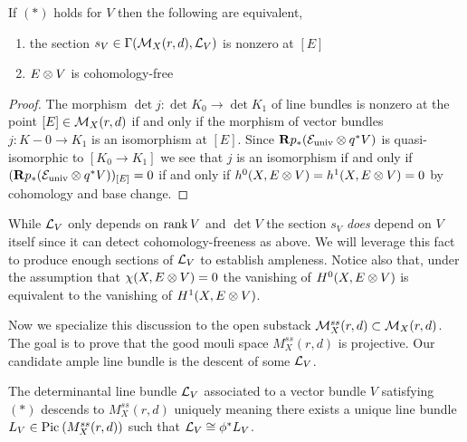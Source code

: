 \documentclass[12pt]{article}
\begin{document}
\begin{prop}
If $(\ast)$ holds for $V$ then the following are equivalent,
\begin{enumerate}
\item the section $s_V \in \Gamma(\mathcal{M}_X(r,d), \mathcal{L}_V)$ is nonzero at $[E]$
\item $E \otimes V$ is cohomology-free
\end{enumerate}
\end{prop}

\begin{proof}
The morphism $\det{j} : \det{K_0} \to \det{K_1}$ of line bundles is nonzero at the point $[E] \in \mathcal{M}_X(r,d)$ if and only if the morphism of vector bundles $j : K-0 \to K_1$ is an isomorphism at $[E]$. Since $\mathbf{R} p_* (\mathcal{E}_{\mathrm{univ}} \otimes q^* V)$ is quasi-isomorphic to $[K_0 \to K_1]$ we see that $j$ is an isomorphism if and only if $(\mathbf{R} p_* (\mathcal{E}_{\mathrm{univ}} \otimes q^* V))_{[E]} = 0$ if and only if $h^0(X, E \otimes V) = h^1(X, E \otimes V) = 0$ by cohomology and base change. 
\end{proof}

\begin{rmk}
While $\mathcal{L}_V$ only depends on $\operatorname{\mathrm{rank}}{V}$ and $\det{V}$ the section $s_V$ \textit{does} depend on $V$ itself since it can detect cohomology-freeness as above. We will leverage this fact to produce enough sections of $\mathcal{L}_V$ to establish ampleness. Notice also that, under the assumption that $\chi(X, E \otimes V) = 0$ the vanishing of $H^0(X, E \otimes V)$ is equivalent to the vanishing of $H^1(X, E \otimes V)$.
\end{rmk}

Now we specialize this discussion to the open substack $\mathcal{M}_X^{ss}(r,d) \subset \mathcal{M}_X(r,d)$. The goal is to prove that the good mouli space $M_X^{ss}(r,d)$ is projective. Our candidate ample line bundle is the descent of some $\mathcal{L}_V$.

\begin{prop}
The determinantal line bundle $\mathcal{L}_V$ associated to a vector bundle $V$ satisfying $(\ast)$ descends to $M_X^{ss}(r,d)$ uniquely meaning there exists a unique line bundle $L_V \in \mathrm{Pic}^{} \left( M_X^{ss}(r,d) \right)$ such that $\mathcal{L}_V \cong \phi^* L_V$.
\end{prop}
\end{document}
